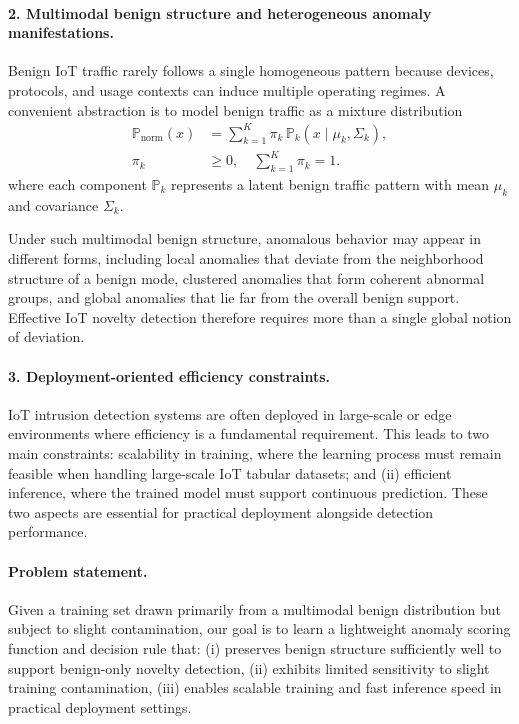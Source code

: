 \documentclass[final,twocolumn,10pt]{elsarticle}
\begin{document}
\paragraph{2. Multimodal benign structure and heterogeneous anomaly manifestations.}
Benign IoT traffic rarely follows a single homogeneous pattern because devices, protocols, and usage contexts can induce multiple operating regimes. A convenient abstraction is to model benign traffic as a mixture distribution
\begin{align}
\mathbb{P}_{\text{norm}}(x)
&= \sum_{k=1}^{K} \pi_k\, \mathbb{P}_k(x \mid \mu_k, \Sigma_k), \\
\pi_k &\ge 0,\quad \sum_{k=1}^{K} \pi_k = 1.
\label{eq:mixture_norm}
\end{align}
where each component $\mathbb{P}_k$ represents a latent benign traffic pattern with mean $\mu_k$ and covariance $\Sigma_k$.

Under such multimodal benign structure, anomalous behavior may appear in different forms, including local anomalies that deviate from the neighborhood structure of a benign mode, clustered anomalies that form coherent abnormal groups, and global anomalies that lie far from the overall benign support. Effective IoT novelty detection therefore requires more than a single global notion of deviation.

\paragraph{3. Deployment-oriented efficiency constraints.}
IoT intrusion detection systems are often deployed in large-scale or edge environments where efficiency is a fundamental requirement. This leads to two main constraints: scalability in training, where the learning process must remain feasible when handling large-scale IoT tabular datasets; and (ii) efficient inference, where the trained model must support continuous prediction. These two aspects are essential for practical deployment alongside detection performance.

\paragraph{Problem statement.}
Given a training set drawn primarily from a multimodal benign distribution but subject to slight contamination, our goal is to learn a lightweight anomaly scoring function and decision rule that:
(i) preserves benign structure sufficiently well to support benign-only novelty detection,
(ii) exhibits limited sensitivity to slight training contamination,
(iii) enables scalable training and fast inference speed in practical deployment settings.
\end{document}
